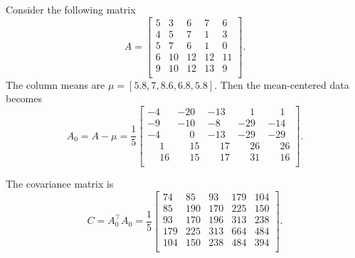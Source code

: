 \def\Amat{\begin{bmatrix}
    5 &  3 &  6 &  7 &  6 \\
    4 &  5 &  7 &  1 &  3 \\
    5 &  7 &  6 &  1 &  0 \\
    6 & 10 & 12 & 12 & 11 \\
    9 & 10 & 12 & 13 &  9 \\
\end{bmatrix}}
Consider the following matrix
\begin{equation}
    A = \Amat.
\end{equation}
The column means are \(\mu = [5.8,7,8.6,6.8,5.8]\).
Then the mean-centered data becomes
\def\-{\phantom{-}}
\begin{equation}
    A_0 = A - \mu = \frac{1}{5}\begin{bmatrix}
        -4 &   -20 &   -13 &   \-1 &   \-1 \\
        -9 &   -10 &    -8 &   -29 &   -14 \\
        -4 &   \-0 &   -13 &   -29 &   -29 \\
        \-1 &  \-15 &  \-17 &  \-26 &  \-26 \\
    \-16 &  \-15 &  \-17 &  \-31 &  \-16 \\
\end{bmatrix}.
\end{equation}

The covariance matrix is
\begin{equation}C = A_0^\top A_0 = \frac{1}{5}\begin{bmatrix}
        74 &  85 &  93 & 179 & 104 \\
        85 & 190 & 170 & 225 & 150 \\
        93 & 170 & 196 & 313 & 238 \\
    179 & 225 & 313 & 664 & 484 \\
    104 & 150 & 238 & 484 & 394 \\
\end{bmatrix}.\end{equation}

